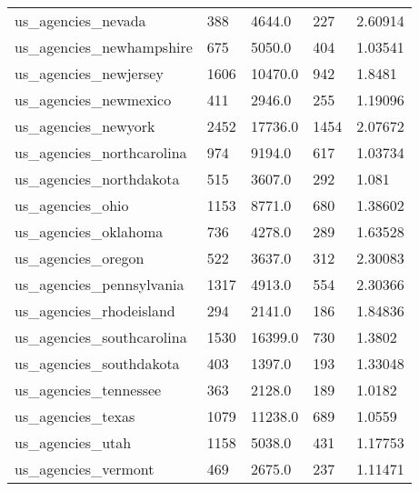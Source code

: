 \begin{longtable}{lllll}
 us\_agencies\_nevada                                 & 388        & 4644.0      & 227   & 2.60914    \\
 us\_agencies\_newhampshire                           & 675        & 5050.0      & 404   & 1.03541    \\
 us\_agencies\_newjersey                              & 1606       & 10470.0     & 942   & 1.8481     \\
 us\_agencies\_newmexico                              & 411        & 2946.0      & 255   & 1.19096    \\
 us\_agencies\_newyork                                & 2452       & 17736.0     & 1454  & 2.07672    \\
 us\_agencies\_northcarolina                          & 974        & 9194.0      & 617   & 1.03734    \\
 us\_agencies\_northdakota                            & 515        & 3607.0      & 292   & 1.081      \\
 us\_agencies\_ohio                                   & 1153       & 8771.0      & 680   & 1.38602    \\
 us\_agencies\_oklahoma                               & 736        & 4278.0      & 289   & 1.63528    \\
 us\_agencies\_oregon                                 & 522        & 3637.0      & 312   & 2.30083    \\
 us\_agencies\_pennsylvania                           & 1317       & 4913.0      & 554   & 2.30366    \\
 us\_agencies\_rhodeisland                            & 294        & 2141.0      & 186   & 1.84836    \\
 us\_agencies\_southcarolina                          & 1530       & 16399.0     & 730   & 1.3802     \\
 us\_agencies\_southdakota                            & 403        & 1397.0      & 193   & 1.33048    \\
 us\_agencies\_tennessee                              & 363        & 2128.0      & 189   & 1.0182     \\
 us\_agencies\_texas                                  & 1079       & 11238.0     & 689   & 1.0559     \\
 us\_agencies\_utah                                   & 1158       & 5038.0      & 431   & 1.17753    \\
 us\_agencies\_vermont                                & 469        & 2675.0      & 237   & 1.11471    \\

\end{longtable}
